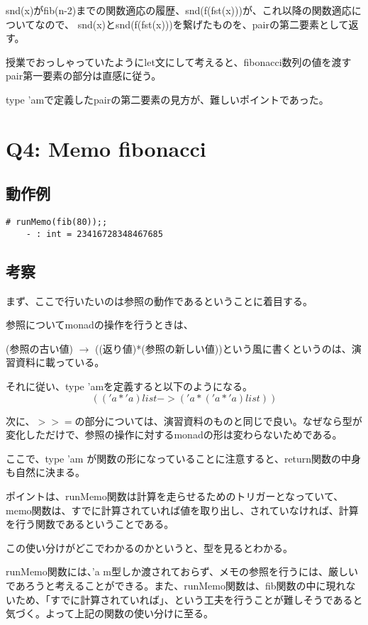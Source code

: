 \documentclass[uplatex,12pt]{jsarticle}
\begin{document}
snd(x)がfib(n-2)までの関数適応の履歴、snd(f(fst(x)))が、これ以降の関数適応についてなので、
snd(x)とsnd(f(fst(x)))を繋げたものを、pairの第二要素として返す。

\vspace{12pt}

授業でおっしゃっていたようにlet文にして考えると、fibonacci数列の値を渡すpair第一要素の部分は直感に従う。

type 'amで定義したpairの第二要素の見方が、難しいポイントであった。




\section{Q4: Memo fibonacci}
\subsection{動作例}
  \begin{lstlisting}[caption=動作例]
    # runMemo(fib(80));;
    - : int = 23416728348467685
  \end{lstlisting}

\subsection{考察}
まず、ここで行いたいのは参照の動作であるということに着目する。

参照についてmonadの操作を行うときは、

(参照の古い値) $\rightarrow$ ((返り値)*(参照の新しい値))という風に書くというのは、演習資料に載っている。

それに従い、type 'amを定義すると以下のようになる。
$$(('a*'a)list -> ('a * ('a*'a)list))$$

次に、$>>=$の部分については、演習資料のものと同じで良い。なぜなら型が変化しただけで、参照の操作に対するmonadの形は変わらないためである。

ここで、type 'am が関数の形になっていることに注意すると、return関数の中身も自然に決まる。

ポイントは、runMemo関数は計算を走らせるためのトリガーとなっていて、memo関数は、すでに計算されていれば値を取り出し、されていなければ、計算を行う関数であるということである。

この使い分けがどこでわかるのかというと、型を見るとわかる。

runMemo関数には、'a m型しか渡されておらず、メモの参照を行うには、厳しいであろうと考えることができる。また、runMemo関数は、fib関数の中に現れないため、「すでに計算されていれば」、という工夫を行うことが難しそうであると気づく。よって上記の関数の使い分けに至る。
\end{document}
